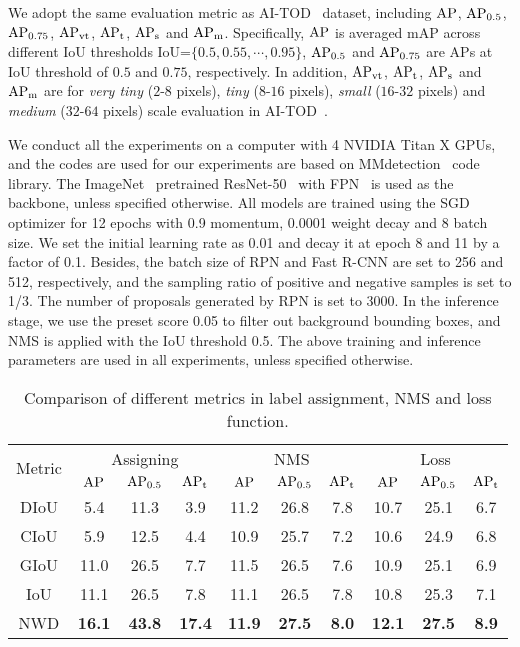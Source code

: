 \documentclass{article}
\newcommand{\fixedvskip}{-3mm}
\begin{document}
We adopt the same evaluation metric as AI-TOD~\cite{AI-TOD_2020_ICPR} dataset, including $\rm{AP}$, $\rm{AP_{0.5}}$, $\rm{AP_{0.75}}$, $\rm{AP}_{vt}$, $\rm{AP}_{t}$, $\rm{AP}_{s}$ and $\rm{AP}_{m}$. Specifically, $\rm{AP}$ is averaged mAP across different IoU thresholds IoU=$\{0.5, 0.55, \cdots, 0.95\}$, $\rm{AP_{0.5}}$ and $\rm{AP_{0.75}}$ are APs at IoU threshold of $0.5$ and $0.75$, respectively. In addition, $\rm{AP}_{vt}$, $\rm{AP}_{t}$, $\rm{AP}_{s}$ and $\rm{AP}_{m}$ are for \textit{very tiny} ($2$-$8$ pixels), \textit{tiny} ($8$-$16$ pixels), \textit{small} ($16$-$32$ pixels) and \textit{medium} ($32$-$64$ pixels) scale evaluation in AI-TOD~\cite{AI-TOD_2020_ICPR}.

We conduct all the experiments on a computer with 4 NVIDIA Titan X GPUs, and the codes are used for our experiments are based on MMdetection~\cite{mmdetection_2019_arXiv} code library. The ImageNet~\cite{ImageNet_2015_IJCV}
pretrained ResNet-50~\cite{ResNet_2016_CVPR} with FPN~\cite{FPN_2017_CVPR} is used as the backbone, unless specified otherwise. All models are trained using the SGD optimizer for 12 epochs with 0.9 momentum, 0.0001 weight decay and 8 batch size. We set the initial learning rate as 0.01 and decay it at epoch 8 and 11 by a factor of 0.1. Besides, the batch size of RPN and Fast R-CNN are set to 256 and 512, respectively, and the sampling ratio of positive and negative samples is set to 1/3. The number of proposals generated by RPN is set to 3000. In the inference stage, we use the preset score 0.05 to filter out background bounding boxes, and NMS is applied with the IoU threshold 0.5. The above training and inference parameters are used in all experiments, unless specified otherwise.



\begin{table*}[t]
	\centering
	\setlength{\belowcaptionskip}{0.2cm}
	\caption{Comparison of different metrics in label assignment, NMS and loss function.}
	\begin{tabular}{|c|ccc|ccc|ccc|}  
	\hline
	\multirow{2}{*}{Metric}  & \multicolumn{3}{c|}{Assigning}  & \multicolumn{3}{c|}{NMS}  & \multicolumn{3}{c|}{Loss}  \\
	 &  $\rm{AP}$ & $\rm{AP_{0.5}}$ & $\rm{AP_{t}}$& $\rm{AP}$ & $\rm{AP_{0.5}}$ & $\rm{AP_{t}}$ &  $\rm{AP}$ & $\rm{AP_{0.5}}$ & $\rm{AP_{t}}$\\
	\hline
	DIoU  & 5.4 & 11.3 & 3.9  & 11.2 & 26.8 & 7.8 & 10.7 & 25.1 & 6.7 \\
	CIoU & 5.9 & 12.5 & 4.4 & 10.9 & 25.7 & 7.2 & 10.6 & 24.9 & 6.8  \\
	GIoU & 11.0 & 26.5  & 7.7 & 11.5 & 26.5 & 7.6 & 10.9 & 25.1 & 6.9  \\
	IoU & 11.1 & 26.5  & 7.8 & 11.1 & 26.5 & 7.8 & 10.8 & 25.3 & 7.1 \\
	NWD & \textbf{16.1} & \textbf{43.8}  & \textbf{17.4} & \textbf{11.9} & \textbf{27.5}  & \textbf{8.0} & \textbf{12.1} & \textbf{27.5}  & \textbf{8.9} \\
	\hline
	\end{tabular}
	\label{tab:metrics}
	\vspace{\fixedvskip}
\end{table*}
\end{document}
